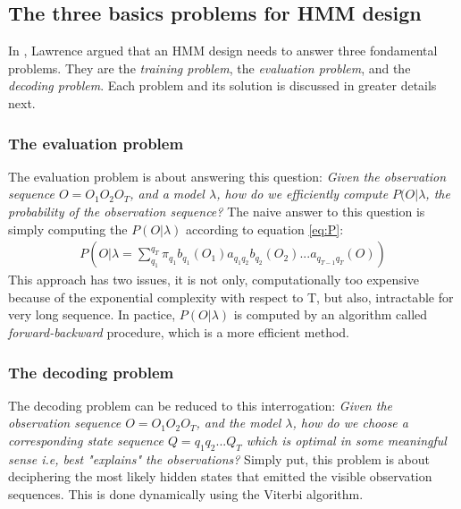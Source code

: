 \subsection{The three basics  problems for HMM design}
In %
, Lawrence argued that an HMM design needs to answer three fondamental problems. They are the \textit{training problem}, the \textit{evaluation problem}, and the \textit{decoding problem}. Each problem and its solution is discussed in greater details next. 

\subsubsection{The evaluation problem}
The evaluation problem is about answering this question:
\textit{Given the observation sequence \(O = O_1O_2O_T\), and a model \(\lambda\), how do we efficiently compute \(P(O|\lambda\), the probability of the observation sequence?} %
The naive answer to this question is simply computing the \(P(O|\lambda)\) according to equation \ref{eq:P}:
\begin{align}
	P(O|\lambda = \sum_{q_1}^{q_T}\pi_{q_1}b_{q_1}(O_1)a_{q_1q_2}b_{q_2}(O_2)...a_{q_{T-1}q_T}(O)) \label{eq:P}
\end{align}
This approach has two issues, it is not only, computationally too expensive because of the exponential complexity with respect to T, but also, intractable for very long sequence. In pactice, \(P(O|\lambda)\) is computed by an algorithm called \textit{forward-backward} procedure, which is a more efficient method.

\subsubsection{The decoding problem}
 The decoding problem can be reduced to this interrogation: \textit{Given the observation sequence \(O = O_1O_2O_T\), and the model \(\lambda\), how do we choose a corresponding state sequence \(Q = q_1q_2...Q_T\) which is optimal in some meaningful sense i.e, best "explains" the observations?}
 Simply put, this problem is about deciphering the most likely hidden states that emitted the visible observation sequences.
 This is done dynamically using the Viterbi algorithm. %
